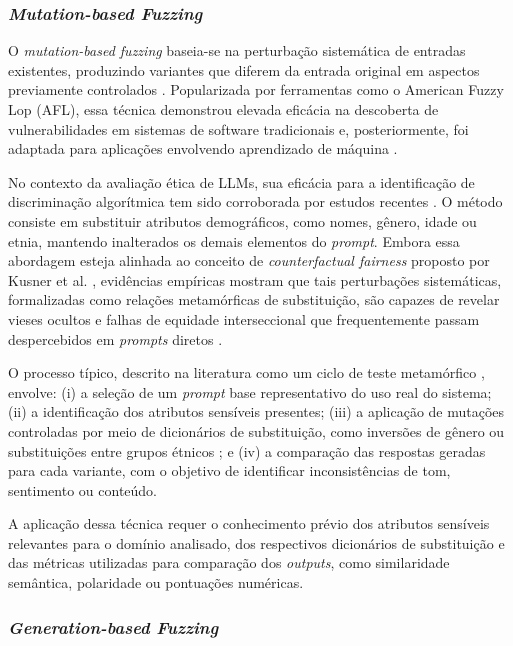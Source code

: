 \subsubsection{\textit{Mutation-based Fuzzing}}
\label{sec:mutation}

O \textit{mutation-based fuzzing} baseia-se na perturbação sistemática de entradas existentes, produzindo variantes que diferem da entrada original em aspectos previamente controlados \cite{Manes2021}. Popularizada por ferramentas como o American Fuzzy Lop (AFL), essa técnica demonstrou elevada eficácia na descoberta de vulnerabilidades em sistemas de software tradicionais e, posteriormente, foi adaptada para aplicações envolvendo aprendizado de máquina \cite{Xie2019}.

No contexto da avaliação ética de LLMs, sua eficácia para a identificação de discriminação algorítmica tem sido corroborada por estudos recentes \cite{Salimian2025, Reddy2025}. O método consiste em substituir atributos demográficos, como nomes, gênero, idade ou etnia, mantendo inalterados os demais elementos do \textit{prompt}. Embora essa abordagem esteja alinhada ao conceito de \textit{counterfactual fairness} proposto por Kusner et al. \cite{Kusner2017}, evidências empíricas mostram que tais perturbações sistemáticas, formalizadas como relações metamórficas de substituição, são capazes de revelar vieses ocultos e falhas de equidade interseccional que frequentemente passam despercebidos em \textit{prompts} diretos \cite{Salimian2025, Reddy2025}.

O processo típico, descrito na literatura como um ciclo de teste metamórfico \cite{Reddy2025}, envolve: (i) a seleção de um \textit{prompt} base representativo do uso real do sistema; (ii) a identificação dos atributos sensíveis presentes; (iii) a aplicação de mutações controladas por meio de dicionários de substituição, como inversões de gênero ou substituições entre grupos étnicos \cite{Salimian2025}; e (iv) a comparação das respostas geradas para cada variante, com o objetivo de identificar inconsistências de tom, sentimento ou conteúdo.

A aplicação dessa técnica requer o conhecimento prévio dos atributos sensíveis relevantes para o domínio analisado, dos respectivos dicionários de substituição e das métricas utilizadas para comparação dos \textit{outputs}, como similaridade semântica, polaridade ou pontuações numéricas.

\subsubsection{\textit{Generation-based Fuzzing}}
\label{sec:generation}

